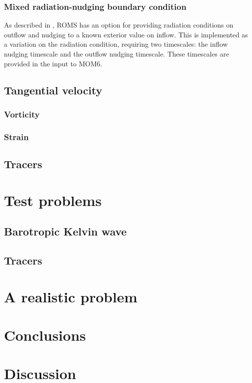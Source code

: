 \documentclass[11pt]{article}
\begin{document}
\subsubsection{Mixed radiation-nudging boundary condition}
As described in \citep{Marchesiello2001}, ROMS has an option for providing
radiation conditions on outflow and nudging to a known exterior
value on inflow. This is implemented as a variation on the radiation
condition, requiring two timescales: the inflow nudging timescale and the
outflow nudging timescale. These timescales are provided in the input to
MOM6.

\subsection{Tangential velocity}
\subsubsection{Vorticity}
\subsubsection{Strain}
\subsection{Tracers}
\section{Test problems}
\subsection{Barotropic Kelvin wave}
\subsection{Tracers}
\section{A realistic problem}
\section{Conclusions}
\section{Discussion}



\end{document}
